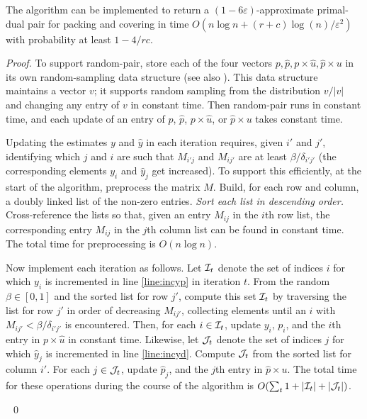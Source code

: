 \documentclass[11pt]{svjour3} \usepackage{fullpage}
\newcommand{\primalOf}[1]{{{#1}}}
\newcommand{\dualOf}[1]{{\hat{#1}}}
\newcommand{\MM}{M}
\newcommand{\yp}{\primalOf y}
\newcommand{\pp}{\primalOf p}
\newcommand{\wwp}{\primalOf u}
\newcommand{\Ip}{\calI}
\newcommand{\yd}{\dualOf y}
\newcommand{\pd}{\dualOf p}
\newcommand{\wwd}{\dualOf u}
\newcommand{\Jd}{\calJ}
\newcommand{\dd}{\delta}
\newenvironment{Proof}{\begin{proof}}{{} ~\hfill\hfill\qed~\end{proof}}
\newcommand{\algfont}{}
\newcommand{\eps}{\varepsilon}
\newcommand{\prob}[1]{{\sc #1}\xspace}
\renewcommand{\prob}[1]{{#1}\xspace}
\newcommand{\calI}{{\cal I}}
\newcommand{\calJ}{{\cal J}}
\newcommand{\rows}{r}
\newcommand{\columns}{c}
\newcommand{\inputsize}{n}
\begin{document}
\begin{theorem}\label{thm:slow}
The algorithm can be implemented to return a $(1-6\eps)$-approximate
primal-dual pair for \prob{packing} and \prob{covering} in time
$O(\inputsize\log \inputsize +(\rows+\columns)\log(\inputsize)/\eps^2)$
with probability at least $1-4/rc$.
\end{theorem}
\begin{Proof}
To support {\algfont random-pair},
store each of the four vectors $\pp,\pd,\pp\times\wwd,\pd\times\wwp$ in its own random-sampling data structure \cite{matias2003dgd}
(see also \cite{hagerup1993oag}).
This data structure maintains a vector $v$;
it supports random sampling from the distribution $v/|v|$
and changing any entry of $v$ in constant time.
Then {\algfont random-pair} runs in constant time,
and each update of an entry of  $\pp$, $\pd$, $\pp\times\wwd$, or $\pd\times\wwp$
takes constant time.

Updating the estimates $\yp$ and $\yd$ in each iteration
requires, given $i'$ and $j'$, identifying which $j$ and $i$ are such that $M_{i'j}$
and $M_{ij'}$ are at least $\beta/\delta_{i'j'}$ (the corresponding elements $\yp_i$ and $\yd_j$ get increased).
To support this efficiently, at the start of the algorithm, preprocess the matrix $\MM$.
Build, for each row and column, a doubly linked list of the non-zero entries.
{\em Sort each list in descending order.} 
Cross-reference the lists so that, 
given an entry $\MM_{ij}$ in the $i$th row list, 
the corresponding entry $\MM_{ij}$ in the $j$th column list 
can be found in constant time.
The total time for preprocessing is
$O(\inputsize\log \inputsize)$.

Now implement each iteration as follows.
Let $\Ip_t$ denote the set of indices $i$ for which $\yp_i$ is incremented in line \ref{line:incyp} in iteration $t$.
From the random $\beta\in[0,1]$ and the sorted list for row $j'$, 
compute this set $\Ip_t$ by traversing the list for row $j'$ in order of decreasing $M_{ij'}$, 
collecting elements until an $i$ with $M_{ij'}<\beta/\dd_{i'j'}$ is encountered.
Then, for each $i\in\Ip_t$, 
update $\yp_i$, $\pp_{i}$, and the $i$th entry in $\pp\times\wwd$ in constant time.
Likewise, let $\Jd_t$ denote the set of indices $j$ for which $\yd_j$ is incremented in line \ref{line:incyd}.
Compute $\Jd_t$ from the sorted list for column $i'$.
For each $j\in\Jd_t$, 
update $\pd_{j}$,  and the $j$th entry in $\pd\times\wwp$.
The total time for these operations during the course of the algorithm is
$O(\sum_t 1+|\Ip_t|+|\Jd_t|)$.


\end{Proof}
\end{document}

